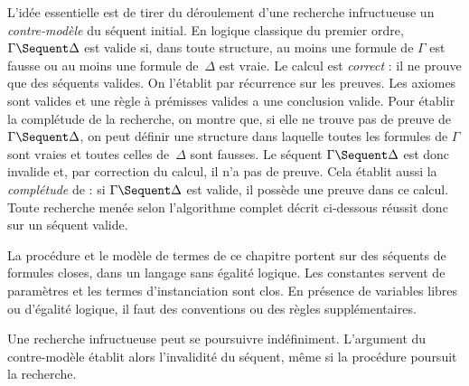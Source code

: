 \documentclass[../../../include/open-logic-section]{subfiles}
\begin{document}
L'idée essentielle est de tirer du déroulement d'une recherche
infructueuse un \emph{contre-modèle} du séquent initial.
En logique classique du premier ordre, $\Gamma \Sequent \Delta$
est valide si, dans toute structure, au moins une formule
de $\Gamma$ est fausse ou au moins une formule de~$\Delta$
est vraie. Le calcul  est \emph{correct} :
il ne prouve que des séquents valides. On l'établit par
récurrence sur les preuves. Les axiomes sont valides
et une règle à prémisses valides a une conclusion valide.
Pour établir la complétude de la recherche, on montre que,
si elle ne trouve pas de preuve de $\Gamma \Sequent \Delta$,
on peut définir une structure dans laquelle toutes les
formules de $\Gamma$ sont vraies et toutes celles
de~$\Delta$ sont fausses. Le séquent
$\Gamma \Sequent \Delta$ est donc invalide
et, par correction du calcul, il n'a pas de preuve.
Cela établit aussi la \emph{complétude} de  :
si $\Gamma \Sequent \Delta$ est valide, il possède une
preuve dans ce calcul. Toute recherche menée selon
l'algorithme complet décrit ci-dessous réussit donc sur
un séquent valide.

La procédure et le modèle de termes de ce chapitre portent
sur des séquents de formules closes, dans un langage sans
égalité logique. Les constantes servent de paramètres
et les termes d'instanciation sont clos. En présence de
variables libres ou d'égalité logique, il faut des
conventions ou des règles supplémentaires.

Une recherche infructueuse peut se poursuivre indéfiniment.
L'argument du contre-modèle établit alors l'invalidité du
séquent, même si la procédure poursuit la recherche.
\end{document}
